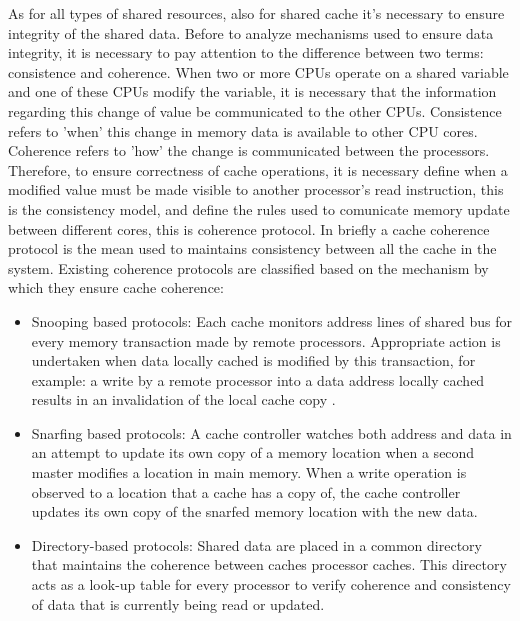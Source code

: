 As for all types of shared resources, also for shared cache it's necessary to ensure integrity of the shared data.
Before to analyze mechanisms used to ensure data integrity, it is necessary to pay attention to the difference between two terms: consistence and coherence.
When two or more CPUs operate on a shared variable and one of these CPUs modify the variable, it is necessary that the information regarding
this change of value be communicated to the other CPUs. Consistence refers to 'when' this change in memory data is available to other CPU cores.
Coherence refers to 'how' the change is communicated between the processors. Therefore, to ensure correctness of cache operations, it is necessary define
when a modified value must be made visible to another processor's read instruction, this is the consistency model, and define the rules used to comunicate 
memory update between different cores, this is coherence protocol. In briefly a cache coherence protocol is the mean used to maintains consistency between
all the cache in the system. Existing coherence protocols are classified based on the mechanism by which they ensure cache coherence: 

\begin{itemize}

\item Snooping based protocols: Each cache monitors address lines of shared bus for every memory transaction made by remote processors. Appropriate action
is undertaken when data locally cached is modified by this transaction, for example: a write by a remote processor into a data address locally cached 
results in an invalidation of the local cache copy .

\item Snarfing based protocols: A cache controller watches both address and data in an attempt to update its own copy of a memory location when a second 
master modifies a location in main memory. When a write operation is observed to a location that a cache has a copy of, the cache controller updates its 
own copy of the snarfed memory location with the new data.

\item Directory-based protocols: Shared data are placed in a common directory that maintains the coherence between caches processor caches. 
This directory acts as a look-up table for every processor to verify coherence and consistency of data that is currently being read or updated.

\end{itemize}


